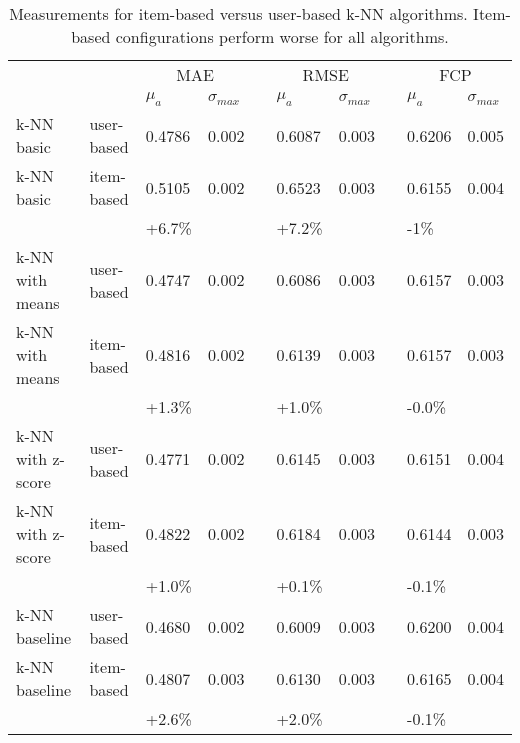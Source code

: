 \begin{sidewaystable}
    \centering
    \caption[User-based versus item-based \gls{knn} algorithms]{Measurements for item-based versus user-based k-NN algorithms. Item-based configurations perform worse for all algorithms.}
    \small
    \begin{tabular}{ll ll l ll l ll }
                 && \multicolumn{2}{c}{MAE} &&
                 \multicolumn{2}{c}{RMSE} &&
                 \multicolumn{2}{c}{FCP} \\
    \cline{3-4} \cline{6-7} \cline{9-10}
    && $\mu_a$ & $\sigma_{max}$ && $\mu_a$ & $\sigma_{max}$ && $\mu_a$ & $\sigma_{max}$ \\
    \hline
    k-NN basic        & user-based & 0.4786 & 0.002 && 0.6087 & 0.003 && 0.6206 & 0.005 \\ %
    k-NN basic        & item-based & 0.5105 & 0.002 && 0.6523 & 0.003 && 0.6155 & 0.004\\ %
                      &            & \textcolor{scw-orange}{+6.7\%} &&& \textcolor{scw-orange}{+7.2\%}
                      &&& \textcolor{scw-orange}{-1\%} \\
    k-NN with means   & user-based & 0.4747 & 0.002 && 0.6086 & 0.003 && 0.6157 & 0.003 \\ %
    k-NN with means   & item-based & 0.4816 & 0.002 && 0.6139 & 0.003 && 0.6157 & 0.003 \\ %
                      &            & \textcolor{scw-orange}{+1.3\%} &&& \textcolor{scw-orange}{+1.0\%}
                      &&& \textcolor{scw-orange}{-0.0\%} \\
    k-NN with z-score & user-based & 0.4771 & 0.002 && 0.6145 & 0.003 && 0.6151 & 0.004 \\ %
    k-NN with z-score & item-based & 0.4822 & 0.002 && 0.6184 & 0.003 && 0.6144 & 0.003 \\ %
                      &            & \textcolor{scw-orange}{+1.0\%} &&& \textcolor{scw-orange}{+0.1\%}
                      &&& \textcolor{scw-orange}{-0.1\%} \\
    k-NN baseline     & user-based & 0.4680 & 0.002 && 0.6009 & 0.003 && 0.6200 & 0.004 \\ %
    k-NN baseline     & item-based & 0.4807 & 0.003 && 0.6130 & 0.003 && 0.6165 & 0.004 \\ %
                      &            & \textcolor{scw-orange}{+2.6\%} &&& \textcolor{scw-orange}{+2.0\%}
                      &&& \textcolor{scw-orange}{-0.1\%} \\
    \end{tabular}
\end{sidewaystable}

